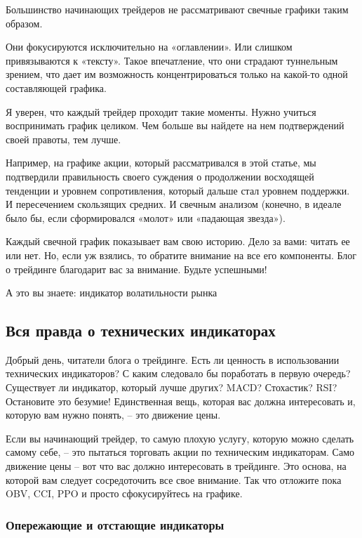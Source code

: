 \documentclass[a5paper]{article}
\begin{document}
Большинство начинающих трейдеров не рассматривают свечные графики таким образом.

Они фокусируются исключительно на «оглавлении». Или слишком привязываются к «тексту». Такое впечатление, что они страдают туннельным зрением, что дает им возможность концентрироваться только на какой-то одной составляющей графика.

Я уверен, что каждый трейдер проходит такие моменты. Нужно учиться воспринимать график целиком. Чем больше вы найдете на нем подтверждений своей правоты, тем лучше.

Например, на графике акции, который рассматривался в этой статье, мы подтвердили правильность своего суждения о продолжении восходящей тенденции и уровнем сопротивления, который дальше стал уровнем поддержки. И пересечением скользящих средних. И свечным анализом (конечно, в идеале было бы, если сформировался «молот» или «падающая звезда»).

Каждый свечной график показывает вам свою историю. Дело за вами: читать ее или нет. Но, если уж взялись, то обратите внимание на все его компоненты. Блог о трейдинге благодарит вас за внимание. Будьте успешными!


А это вы знаете: индикатор волатильности рынка

\subsection{Вся правда о технических индикаторах}

Добрый день, читатели блога о трейдинге. Есть ли ценность в использовании технических индикаторов? С каким следовало бы поработать в первую очередь? Существует ли индикатор, который лучше других? MACD? Стохастик? RSI? Остановите это безумие! Единственная вещь, которая вас должна интересовать и, которую вам нужно понять, – это движение цены.

Если вы начинающий трейдер, то самую плохую услугу, которую можно
сделать самому себе, – это пытаться торговать акции по техническим
индикаторам. Само движение цены – вот что вас должно интересовать в
трейдинге. Это основа, на которой вам следует сосредоточить все свое
внимание.  Так что отложите пока OBV, CCI, PPO и просто сфокусируйтесь
на графике.

\subsubsection{Опережающие и отстающие индикаторы}
\end{document}
